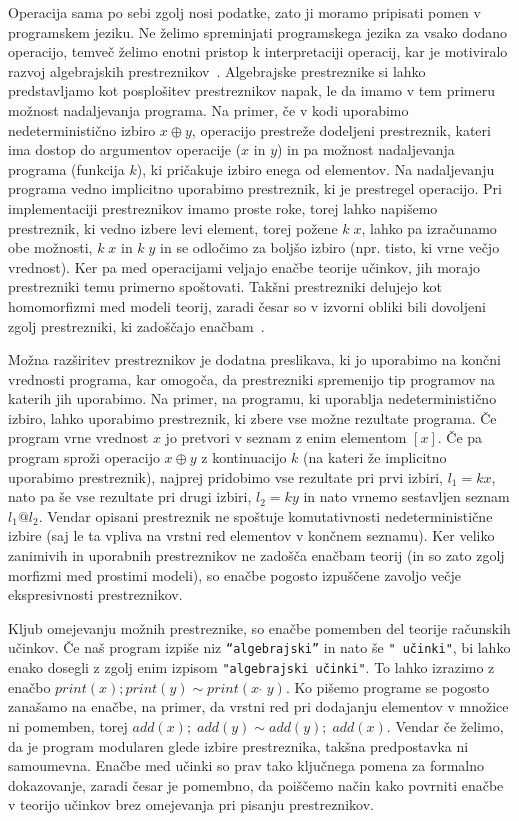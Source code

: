 \documentclass{article}
\begin{document}
Operacija sama po sebi zgolj nosi podatke, zato ji moramo pripisati pomen v programskem jeziku. Ne želimo spreminjati programskega jezika za vsako dodano operacijo, temveč želimo enotni pristop k interpretaciji operacij, kar je motiviralo razvoj algebrajskih prestreznikov~\cite{DBLP:phd/ethos/Pretnar10}. Algebrajske prestreznike si lahko predstavljamo kot posplošitev prestreznikov napak, le da imamo v tem primeru možnost nadaljevanja programa. Na primer, če v kodi uporabimo nedeterministično izbiro $x \oplus y$, operacijo prestreže dodeljeni prestreznik, kateri ima dostop do argumentov operacije ($x$ in $y$) in pa možnost nadaljevanja programa (funkcija $k$), ki pričakuje izbiro enega od elementov. Na nadaljevanju programa vedno implicitno uporabimo prestreznik, ki je prestregel operacijo. Pri implementaciji prestreznikov imamo proste roke, torej lahko napišemo prestreznik, ki vedno izbere levi element, torej požene $k\; x$, lahko pa izračunamo obe možnosti, $k\; x$ in $k\; y$ in se odločimo za boljšo izbiro (npr. tisto, ki vrne večjo vrednost). Ker pa med operacijami veljajo enačbe teorije učinkov, jih morajo prestrezniki temu primerno spoštovati. Takšni prestrezniki delujejo kot homomorfizmi med modeli teorij, zaradi česar so v izvorni obliki bili dovoljeni zgolj prestrezniki, ki zadoščajo enačbam~\cite{DBLP:conf/esop/PlotkinP09}.

Možna razširitev prestreznikov je dodatna preslikava, ki jo uporabimo na končni vrednosti programa, kar omogoča, da prestrezniki spremenijo tip programov na katerih jih uporabimo. Na primer, na programu, ki uporablja nedeterministično izbiro, lahko uporabimo prestreznik, ki zbere vse možne rezultate programa. Če program vrne vrednost $x$ jo pretvori v seznam z enim elementom $[x]$. Če pa program sproži operacijo $x \oplus y$ z kontinuacijo $k$ (na kateri že implicitno uporabimo prestreznik), najprej pridobimo vse rezultate pri prvi izbiri, $l_1 = k x$, nato pa še vse rezultate pri drugi izbiri, $l_2 = k y$ in nato vrnemo sestavljen seznam $l_1 @ l_2$. Vendar opisani prestreznik ne spoštuje komutativnosti nedeterministične izbire (saj le ta vpliva na vrstni red elementov v končnem seznamu). Ker veliko zanimivih in uporabnih prestreznikov ne zadošča enačbam teorij (in so zato zgolj morfizmi med prostimi modeli), so enačbe pogosto izpuščene zavoljo večje ekspresivnosti prestreznikov.

Kljub omejevanju možnih prestreznike, so enačbe pomemben del teorije računskih učinkov. Če naš program izpiše niz \texttt{``algebrajski''} in nato še \texttt{" učinki"}, bi lahko enako dosegli z zgolj enim izpisom \texttt{"algebrajski učinki"}. To lahko izrazimo z enačbo $print(x); print(y) \sim print(x\;\hat{}\;y)$. Ko pišemo programe se pogosto zanašamo na enačbe, na primer, da vrstni red pri dodajanju elementov v množice ni pomemben, torej $add(x);\; add(y) \sim add(y);\; add(x)$. Vendar če želimo, da je program modularen glede izbire prestreznika, takšna predpostavka ni samoumevna. Enačbe med učinki so prav tako ključnega pomena za formalno dokazovanje, zaradi česar je pomembno, da poiščemo način kako povrniti enačbe v teorijo učinkov brez omejevanja pri pisanju prestreznikov.
\end{document}

